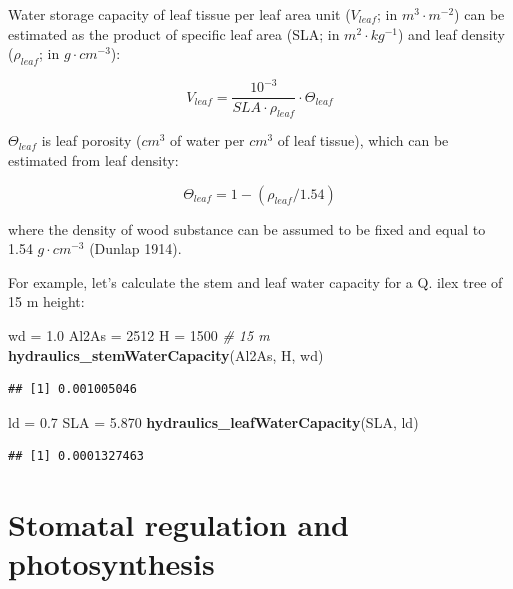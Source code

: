 \documentclass[]{book}
\newenvironment{Shaded}{\begin{snugshade}}{\end{snugshade}}
\newcommand{\KeywordTok}[1]{\textcolor[rgb]{0.13,0.29,0.53}{\textbf{#1}}}
\newcommand{\DecValTok}[1]{\textcolor[rgb]{0.00,0.00,0.81}{#1}}
\newcommand{\FloatTok}[1]{\textcolor[rgb]{0.00,0.00,0.81}{#1}}
\newcommand{\StringTok}[1]{\textcolor[rgb]{0.31,0.60,0.02}{#1}}
\newcommand{\CommentTok}[1]{\textcolor[rgb]{0.56,0.35,0.01}{\textit{#1}}}
\newcommand{\NormalTok}[1]{#1}
\begin{document}
Water storage capacity of leaf tissue per leaf area unit (\(V_{leaf}\);
in \(m^3 \cdot m^{-2}\)) can be estimated as the product of specific
leaf area (SLA; in \(m^2 \cdot kg^{-1}\)) and leaf density
(\(\rho_{leaf}\); in \(g \cdot cm^{-3}\)):

\begin{equation}
V_{leaf} = \frac{10^{-3}}{SLA \cdot \rho_{leaf}} \cdot \Theta_{leaf}
\end{equation}

\(\Theta_{leaf}\) is leaf porosity (\(cm^3\) of water per \(cm^3\) of
leaf tissue), which can be estimated from leaf density:

\begin{equation}
\Theta_{leaf} = 1 - (\rho_{leaf} / 1.54)
\end{equation}

where the density of wood substance can be assumed to be fixed and equal
to 1.54 \(g \cdot cm^{-3}\) (Dunlap 1914).

For example, let's calculate the stem and leaf water capacity for a Q.
ilex tree of 15 m height:

\begin{Shaded}
\begin{Highlighting}[]
\NormalTok{wd =}\StringTok{ }\FloatTok{1.0}
\NormalTok{Al2As =}\StringTok{ }\DecValTok{2512} 
\NormalTok{H =}\StringTok{ }\DecValTok{1500} \CommentTok{# 15 m}
\KeywordTok{hydraulics_stemWaterCapacity}\NormalTok{(Al2As, H, wd)}
\end{Highlighting}
\end{Shaded}

\begin{verbatim}
## [1] 0.001005046
\end{verbatim}

\begin{Shaded}
\begin{Highlighting}[]
\NormalTok{ld =}\StringTok{ }\FloatTok{0.7}
\NormalTok{SLA =}\StringTok{ }\FloatTok{5.870} 
\KeywordTok{hydraulics_leafWaterCapacity}\NormalTok{(SLA, ld)}
\end{Highlighting}
\end{Shaded}

\begin{verbatim}
## [1] 0.0001327463
\end{verbatim}

\section{Stomatal regulation and
photosynthesis}\label{stomatal-regulation-and-photosynthesis}
\end{document}
